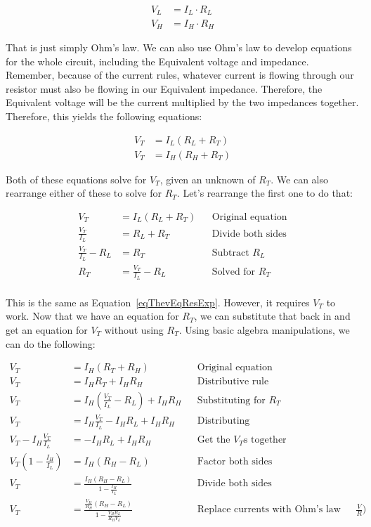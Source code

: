 \begin{align*}
V_L &= I_L \cdot R_L \\
V_H &= I_H \cdot R_H
\end{align*}

That is just simply Ohm's law.
We can also use Ohm's law to develop equations for the whole circuit, including the \thev Equivalent voltage and impedance.
Remember, because of the current rules, whatever current is flowing through our resistor must also be flowing in our \thev Equivalent impedance.
Therefore, the \thev Equivalent voltage will be the current multiplied by the two impedances together.
Therefore, this yields the following equations:

\begin{align*}
V_T &= I_L (R_L + R_T) \\
V_T &= I_H (R_H + R_T)
\end{align*}

Both of these equations solve for $V_T$, given an unknown of $R_T$.  
We can also rearrange either of these to solve for $R_T$.  
Let's rearrange the first one to do that:

\begin{align*}
V_T &= I_L (R_L + R_T) && \textrm{Original equation} \\
\frac{V_T}{I_L} &= R_L + R_T  && \textrm{Divide both sides} \\
\frac{V_T}{I_L} - R_L &= R_T && \textrm{Subtract $R_L$} \\
R_T &= \frac{V_T}{I_L} - R_L && \textrm{Solved for $R_T$} \\
\end{align*}

This is the same as Equation~\ref{eqThevEqResExp}.
However, it requires $V_T$ to work.
Now that we have an equation for $R_T$, we can substitute that back in and get an equation for $V_T$ without using $R_T$.
Using basic algebra manipulations, we can do the following:

\begin{align*}
V_T &= I_H (R_T + R_H) && \textrm{Original equation} \\
V_T &= I_H R_T + I_H R_H && \textrm{Distributive rule} \\
V_T &= I_H (\frac{V_T}{I_L} - R_L) + I_H R_H && \textrm{Substituting for $R_T$} \\
V_T &= I_H \frac{V_T}{I_L} - I_H R_L + I_H R_H && \textrm{Distributing} \\
V_T - I_H \frac{V_T}{I_L} &= - I_H R_L + I_H R_H && \textrm{Get the $V_T$s together} \\
V_T(1 - \frac{I_H}{I_L}) &= I_H (R_H - R_L) && \textrm{Factor both sides} \\
V_T &= \frac{I_H (R_H - R_L)}{1 - \frac{I_H}{I_L}} && \textrm{Divide both sides} \\
V_T &= \frac{\frac{V_H}{R_H} (R_H - R_L)}{1 - \frac{V_H R_L}{R_H V_L}} && \textrm{Replace currents with Ohm's law equivalents ($\frac{V}{R}$)}
\end{align*}

